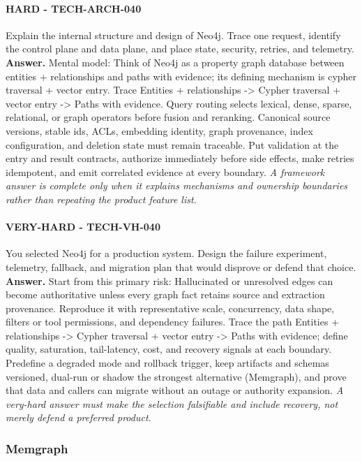 \paragraph{HARD - TECH-ARCH-040} Explain the internal structure and design of Neo4j. Trace one request, identify the control plane and data plane, and place state, security, retries, and telemetry.
\textbf{Answer.} Mental model: Think of Neo4j as a property graph database between entities + relationships and paths with evidence; its defining mechanism is cypher traversal + vector entry. Trace Entities + relationships -> Cypher traversal + vector entry -> Paths with evidence. Query routing selects lexical, dense, sparse, relational, or graph operators before fusion and reranking. Canonical source versions, stable ids, ACLs, embedding identity, graph provenance, index configuration, and deletion state must remain traceable. Put validation at the entry and result contracts, authorize immediately before side effects, make retries idempotent, and emit correlated evidence at every boundary.
\textit{A framework answer is complete only when it explains mechanisms and ownership boundaries rather than repeating the product feature list.}
\paragraph{VERY-HARD - TECH-VH-040} You selected Neo4j for a production system. Design the failure experiment, telemetry, fallback, and migration plan that would disprove or defend that choice.
\textbf{Answer.} Start from this primary risk: Hallucinated or unresolved edges can become authoritative unless every graph fact retains source and extraction provenance. Reproduce it with representative scale, concurrency, data shape, filters or tool permissions, and dependency failures. Trace the path Entities + relationships -> Cypher traversal + vector entry -> Paths with evidence; define quality, saturation, tail-latency, cost, and recovery signals at each boundary. Predefine a degraded mode and rollback trigger, keep artifacts and schemas versioned, dual-run or shadow the strongest alternative (Memgraph), and prove that data and callers can migrate without an outage or authority expansion.
\textit{A very-hard answer must make the selection falsifiable and include recovery, not merely defend a preferred product.}
\subsubsection*{Memgraph}
